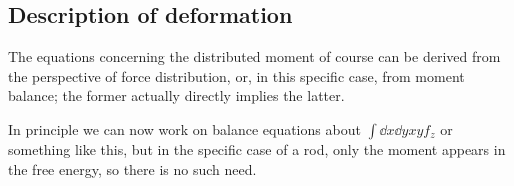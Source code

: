 \documentclass[hyperref, a4paper]{article}
\begin{document}
\subsection{Description of deformation}

The equations concerning the distributed moment 
of course can be derived from the perspective of 
force distribution,
or, in this specific case, from moment balance;
the former actually directly implies the latter.

In principle we can now work on balance equations about 
$\int \dd{x} \dd{y} xy f_z$ or something like this, 
but in the specific case of a rod, 
only the moment appears in the free energy, 
so there is no such need.

\printbibliography
\end{document}
